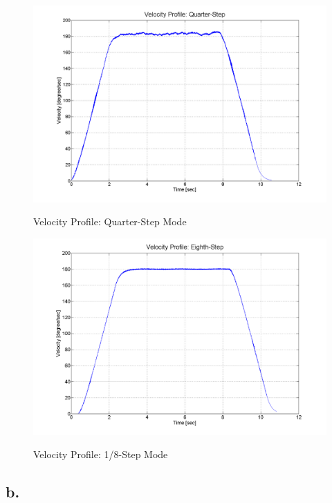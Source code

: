\documentclass{article}
\theoremstyle{plain}
\theoremstyle{definition}
\theoremstyle{remark}
\begin{document}
\begin{figure}[h!]
\begin{center}
\includegraphics[width=12cm]{Q4_quarter_step.png}
\caption{Velocity Profile: Quarter-Step Mode} \label{tex}
\label{fig:q4_13}
\end{center}
\end{figure}

\begin{figure}[h!]
\begin{center}
\includegraphics[width=12cm]{Q4_eighth_step.png}
\caption{Velocity Profile: 1/8-Step Mode} \label{tex}
\label{fig:q4_14}
\end{center}
\end{figure}

\clearpage

\subsection*{b.}
\end{document}
